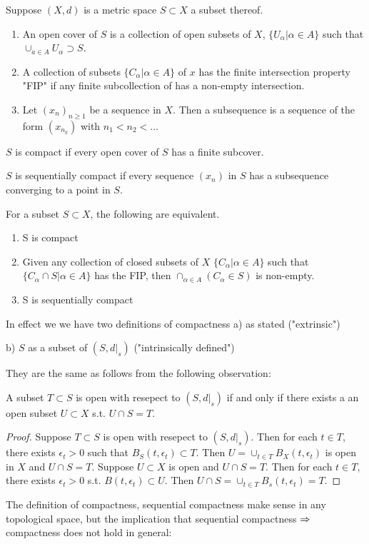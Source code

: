 
\begin{term}
Suppose $(X,d)$ is a metric space $S\subset X$ a subset thereof. 
\begin{enumerate}
\item An open cover of $S$ is a collection of open subsets of $X$, $\{ U_\alpha|\alpha \in A\}$ such that $\cup_{a\in A} U_\alpha \supset S$.
\item A collection of subsets $\{C_\alpha | \alpha \in A \}$ of $x$ has the finite intersection property "FIP" if any finite subcollection of  has a non-empty intersection.
\item Let $(x_n)_{n\geq 1}$ be a sequence in $X$. Then a subsequence is a sequence of the form $(x_{n_k})$ with $n_1<n_2<\ldots$ 
\end{enumerate}
\end{term}
\begin{mydef}
$S$ is compact if every open cover of $S$ has a finite subcover. \par
$S$ is sequentially compact if every sequence $(x_n)$ in $S$ has a subsequence converging to a point in $S$. 
\end{mydef}
\begin{thrm}
For a subset $S\subset X$, the following are equivalent.
\begin{enumerate}
\item S is compact
\item Given any collection of closed subsets of $X$ $\{ C_\alpha | \alpha \in A \}$ such that $\{C_\alpha \cap S | \alpha \in A\}$ has the FIP, then $\cap_{\alpha \in A} (C_\alpha \in S)$ is non-empty.
\item S is sequentially compact
\end{enumerate}
\end{thrm}
\begin{rem}
\item In effect we we have two definitions of compactness
a) as stated ("extrinsic") \par
b) $S$ as a subset of $(S,d|_s)$ ("intrinsically defined")\par 
They are the same as follows from the following observation:\par 
A subset $T\subset S$ is open with resepect to $(S,d|_s)$ if and only if there exists a an open subset $U\subset X$ s.t. $U\cap S=T$.
\begin{proof}
\biu{$\so$} Suppose $T\subset S$ is open with resepect to $(S,d|_s)$. Then for each $t\in T$, there exists $\epsilon_t >0$ such that $B_S(t,\epsilon_t)\subset T$. Then $U=\cup_{t\in T} B_X(t,\epsilon_t)$ is open in $X$ and $U\cap S=T$.
\biu{$\onlyif$} Suppose $U\subset X$ is open and $U\cap S=T$. Then for each $t\in T$, there exists $\epsilon_t>0$ s.t. $B(t,\epsilon_t)\subset U$. Then $U \cap S = \cup_{t\in T} B_s(t,\epsilon_t) = T$.
\end{proof}
\item The definition of compactness, sequential compactness make sense in any topological space, but the implication that sequential compactness $\so$ compactness does not hold in general:
\end{rem}
